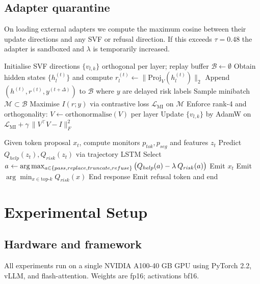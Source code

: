 \documentclass{article}
\begin{document}
\subsection{Adapter quarantine}
On loading external adapters we compute the maximum cosine between their update directions and any SVF or refusal direction. If this exceeds $\tau = 0.48$ the adapter is sandboxed and $\lambda$ is temporarily increased.
\begin{algorithm}
\caption{Online SVF meta-update with replay}
\begin{algorithmic}[1]
\State Initialise SVF directions $\{v_{l,k}\}$ orthogonal per layer; replay buffer $\mathcal{B} \leftarrow \emptyset$
  \State Obtain hidden states $\{h_{l}^{(t)}\}$ and compute $r_{l}^{(t)} \leftarrow \lVert \mathrm{Proj}_{V}(h_{l}^{(t)}) \rVert_{2}$
  \State Append $(h^{(t)}, r^{(t)}, y^{(t+\Delta)})$ to $\mathcal{B}$ where $y$ are delayed risk labels
    \State Sample minibatch $\mathcal{M} \subset \mathcal{B}$
    \State Maximise $I(r; y)$ via contrastive loss $\mathcal{L}_{\mathrm{MI}}$ on $\mathcal{M}$
    \State Enforce rank-4 and orthogonality: $V \leftarrow \mathrm{orthonormalise}(V)$ per layer
    \State Update $\{v_{l,k}\}$ by AdamW on $\mathcal{L}_{\mathrm{MI}} + \gamma\,\lVert V^{\top}V - I\rVert_{F}^{2}$
  \EndIf
\EndFor
\end{algorithmic}
\end{algorithm}
\begin{algorithm}
\caption{Dual-policy decoding control}
\begin{algorithmic}[1]
\State Given token proposal $x_{t}$, compute monitors $p_{tok}, p_{seg}$ and features $z_{t}$
\State Predict $Q_{help}(z_{t}), Q_{risk}(z_{t})$ via trajectory LSTM
\State Select $a^{\*} \leftarrow \arg\max_{a\in\{pass, replace, truncate, refuse\}} \big(Q_{help}(a) - \lambda^{\*}\,Q_{risk}(a)\big)$
 \State Emit $x_{t}$
 \State Emit $\arg\min_{x\in\mathrm{top}\text{-}k} Q_{risk}(x)$
 \State End response
\Else \State Emit refusal token and end
\EndIf
\end{algorithmic}
\end{algorithm}

\section{Experimental Setup}
\subsection{Hardware and framework}
All experiments run on a single NVIDIA A100-40 GB GPU using PyTorch 2.2, vLLM, and flash-attention. Weights are fp16; activations bf16.
\end{document}
